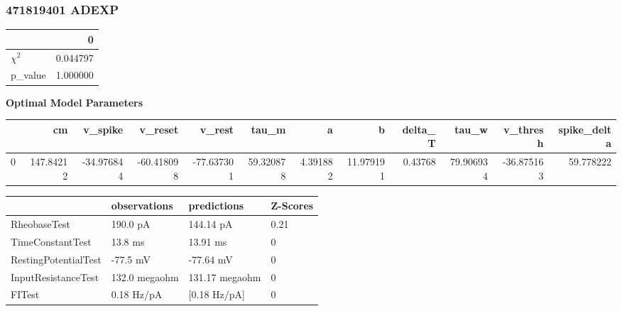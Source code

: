 \subsubsection{471819401 ADEXP}\begin{tabular}{lr}
\toprule
{} &         0 \\
\midrule
$\chi^{2}$ &  0.044797 \\
p\_value    &  1.000000 \\
\bottomrule
\end{tabular}
\textbf{Optimal Model Parameters} \begin{tabular}{lrrrrrrrrrrr}
\toprule
{} &         cm &    v\_spike &    v\_reset &     v\_rest &      tau\_m &         a &          b &  delta\_T &      tau\_w &   v\_thresh &  spike\_delta \\
\midrule
0 &  147.84212 & -34.976844 & -60.418098 & -77.637301 &  59.320878 &  4.391882 &  11.979191 &  0.43768 &  79.906934 & -36.875163 &    59.778222 \\
\bottomrule
\end{tabular}
\begin{tabular}{llll}
\toprule
{} &   observations &     predictions & Z-Scores \\
\midrule
RheobaseTest         &       190.0 pA &       144.14 pA &     0.21 \\
TimeConstantTest     &        13.8 ms &        13.91 ms &        0 \\
RestingPotentialTest &       -77.5 mV &       -77.64 mV &        0 \\
InputResistanceTest  &  132.0 megaohm &  131.17 megaohm &        0 \\
FITest               &     0.18 Hz/pA &    [0.18 Hz/pA] &        0 \\
\bottomrule
\end{tabular}
